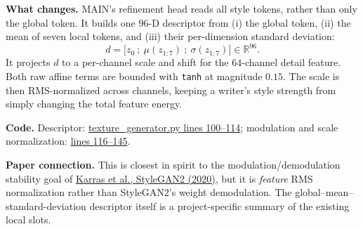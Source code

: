\documentclass[10pt,a4paper]{article}
\newcommand{\paper}[2]{\href{#1}{#2}}
\begin{document}
\textbf{What changes.}  MAIN's refinement head reads all style tokens, rather than only the global token.  It builds one $96$-D descriptor from (i) the global token, (ii) the mean of seven local tokens, and (iii) their per-dimension standard deviation:
\[
 d=\big[z_0\ ;\ \mu(z_{1:7})\ ;\ \sigma(z_{1:7})\big]\in\mathbb{R}^{96}.
\]
It projects $d$ to a per-channel scale and shift for the $64$-channel detail feature.  Both raw affine terms are bounded with \texttt{tanh} at magnitude $0.15$.  The scale is then RMS-normalized across channels, keeping a writer's style strength from simply changing the total feature energy.

\textbf{Code.}  Descriptor: \href{https://github.com/rquq/HGGAN_test/blob/main/networks/texture_generator.py\#L100-L114}{texture\_generator.py lines 100--114}; modulation and scale normalization: \href{https://github.com/rquq/HGGAN_test/blob/main/networks/texture_generator.py\#L116-L145}{lines 116--145}.

\textbf{Paper connection.}  This is closest in spirit to the modulation/demodulation stability goal of \paper{https://arxiv.org/abs/1912.04958}{Karras et al., StyleGAN2 (2020)}, but it is \emph{feature} RMS normalization rather than StyleGAN2's weight demodulation.  The global--mean--standard-deviation descriptor itself is a project-specific summary of the existing local slots.

\begin{center}
\end{center}
\end{document}
